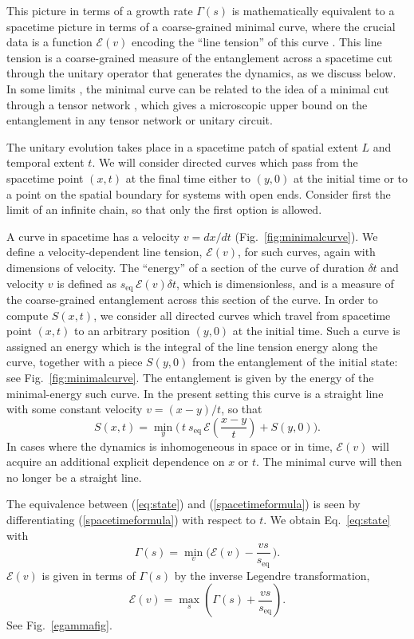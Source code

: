 \documentclass[aps,prx,twocolumn,superscriptaddress,floatfix,nofootinbib,prx]{revtex4}
\newcommand{\f}{\frac}
\renewcommand{\>}{\right\rangle}
\newcommand{\<}{\left\langle}
\newcommand{\be}{\begin{equation}}
\newcommand{\ee}{\end{equation}}
\newcommand{\lf}{\left(}
\newcommand{\ri}{\right)}
\newcommand{\seq}{s_\text{eq}}
\newcommand{\lt}{\mathcal{E}}
\begin{document}
This picture in terms of a growth rate $\Gamma(s)$ is mathematically equivalent to a spacetime picture in terms of a coarse-grained minimal curve, where the crucial data is a function  $\lt(v)$ encoding the ``line tension'' of this curve \cite{nahum}.  This line tension is a coarse-grained measure of the entanglement across a spacetime cut through the unitary operator that generates the dynamics, as we discuss below.
In some limits \cite{nahum}, the minimal curve can be related to the idea of a minimal cut through a tensor network \cite{swingleentanglementrenormalization, casini,pastawski,hayden}, which gives a microscopic upper bound on the entanglement in any tensor network or unitary circuit.

The unitary evolution takes place in a spacetime patch of spatial extent $L$ and temporal extent $t$. We will consider directed curves which pass from the spacetime point $(x,t)$ at the final time either to $(y,0)$ at the initial time or to a point 
on the spatial boundary for systems with open ends.  Consider first the limit of an infinite chain, so that only the first option is allowed. 

A curve in spacetime has a velocity $v=dx/dt$ (Fig.~\ref{fig:minimalcurve}). We define a velocity-dependent line tension, $\lt(v)$, for such curves, again with dimensions of velocity.  The ``energy''  of a section of the curve of duration $\delta t$ and velocity $v$ is defined as $\seq\, \lt(v) \delta t$, which is dimensionless, and is a measure of the coarse-grained entanglement across this section of the curve.  In order to compute $S(x,t)$, we consider all directed curves which travel from spacetime point $(x,t)$ 
to an arbitrary position $(y,0)$ at the initial time.
Such a curve is assigned an energy which is the integral of the line tension energy along the curve, together with a piece $S(y,0)$ from the entanglement of the initial state: see Fig.~\ref{fig:minimalcurve}.  The entanglement is given by the energy of the minimal-energy such curve.  In the present setting this curve is a straight line with some constant velocity $v=(x-y)/t$, so that
\be\label{spacetimeformula}
S\lf x,t\ri = \min_y \bigg(
 \, t ~\seq \, \lt \lf \f{x-y}{t}  \ri + S\lf y, 0 \ri 
\bigg).
\ee
In cases where the dynamics is inhomogeneous in space \cite{nahum2} or in time,
$\lt(v)$ will acquire an additional explicit dependence on $x$ or $t$. The minimal curve will then no longer be a straight line. 




The equivalence between (\ref{eq:state}) and (\ref{spacetimeformula}) is seen by differentiating (\ref{spacetimeformula}) with respect to $t$. We obtain Eq.~\ref{eq:state} with 
\be\label{legendre_transform}
\Gamma(s) =  \min_v \bigg( 
  \lt (v)  -   \f{vs}{\seq}    \,
\bigg).
\ee
$\lt(v)$ is given in terms of $\Gamma(s)$ by the inverse Legendre transformation,
\be
\label{eq:inverselegendre}
\lt(v) = \max_s \left(\Gamma(s) +  \frac{vs}{\seq}  \right).
\ee
See Fig.~\ref{egammafig}.
\end{document}
